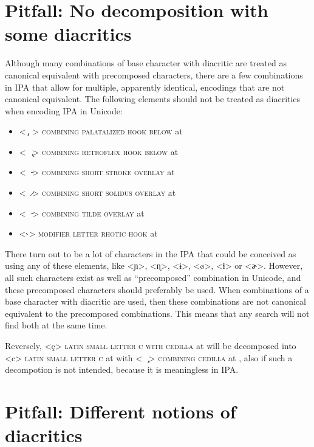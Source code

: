 \section{Pitfall: No decomposition with some diacritics}
\label{pitfall-no-decomposition-of-overlay}

Although many combinations of base character with diacritic are treated as 
canonical equivalent with precomposed characters, there are a few combinations 
in IPA that allow for multiple, apparently identical, encodings that are not 
canonical equivalent. The following elements should not be treated as diacritics 
when encoding IPA in Unicode:
\begin{itemize}
  \item <\ {\large  ̡}\ > \textsc{combining palatalized hook below} at 
  \item <\ \ {\large  ̢}> \textsc{combining retroflex hook below} at 
  \item <\ \ {\large  ̵}> \textsc{combining short stroke overlay} at 
  \item <\ \ {\large  ̷}> \textsc{combining short solidus overlay} at 
  \item <\ \ {\large  ̴}> \textsc{combining tilde overlay} at 
  \item <{\large ˞}> \textsc{modifier letter rhotic hook} at 
\end{itemize} 

There turn out to be a lot of characters in the IPA that could be conceived as 
using any of these elements, like <ɲ>, <ɳ>, <ɨ>, <ø>, <ɫ> or <ɚ>. However, all 
such characters exist as well as ``precomposed'' combination in Unicode, and these 
precomposed characters should preferably be used. When combinations of a base 
character with diacritic are used, then these combinations are not canonical 
equivalent to the precomposed combinations. This means that any search will not 
find both at the same time.

Reversely, <ç> \textsc{latin small letter c with cedilla} at  will be
decomposed into <c> \textsc{latin small letter c} at  with 
<\ \ {\large  ̧}> \textsc{combining cedilla} at , 
also if such a decompotion is not intended, because it is meaningless in IPA.

\section{Pitfall: Different notions of diacritics}
\label{pitfall-the-ipa-notion-of-diacritics-is-not-the-same-as-the-unicode-standards-notion-of-diacritics}

